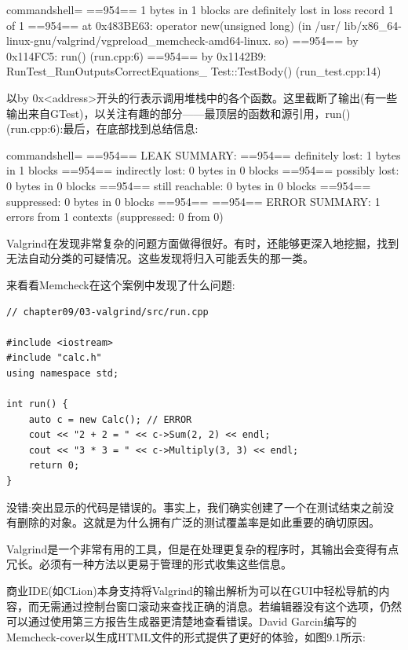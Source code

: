 \begin{tcblisting}{commandshell={}}
==954== 1 bytes in 1 blocks are definitely lost in loss record
1 of 1
==954== at 0x483BE63: operator new(unsigned long) (in /usr/
lib/x86_64-linux-gnu/valgrind/vgpreload_memcheck-amd64-linux.
so)
==954== by 0x114FC5: run() (run.cpp:6)
==954== by 0x1142B9: RunTest_RunOutputsCorrectEquations_
Test::TestBody() (run_test.cpp:14)
\end{tcblisting}

以by 0x<address>开头的行表示调用堆栈中的各个函数。这里截断了输出(有一些输出来自GTest)，以关注有趣的部分——最顶层的函数和源引用，run()(run.cpp:6):最后，在底部找到总结信息:

\begin{tcblisting}{commandshell={}}
==954== LEAK SUMMARY:
==954==     definitely lost: 1 bytes in 1 blocks
==954==     indirectly lost: 0 bytes in 0 blocks
==954==       possibly lost: 0 bytes in 0 blocks
==954==     still reachable: 0 bytes in 0 blocks
==954==          suppressed: 0 bytes in 0 blocks
==954==
==954== ERROR SUMMARY: 1 errors from 1 contexts (suppressed: 0
from 0)
\end{tcblisting}

Valgrind在发现非常复杂的问题方面做得很好。有时，还能够更深入地挖掘，找到无法自动分类的可疑情况。这些发现将归入可能丢失的那一类。

来看看Memcheck在这个案例中发现了什么问题:

\begin{lstlisting}[style=styleCXX]
// chapter09/03-valgrind/src/run.cpp

#include <iostream>
#include "calc.h"
using namespace std;

int run() {
	auto c = new Calc(); // ERROR
	cout << "2 + 2 = " << c->Sum(2, 2) << endl;
	cout << "3 * 3 = " << c->Multiply(3, 3) << endl;
	return 0;
}
\end{lstlisting}

没错:突出显示的代码是错误的。事实上，我们确实创建了一个在测试结束之前没有删除的对象。这就是为什么拥有广泛的测试覆盖率是如此重要的确切原因。

Valgrind是一个非常有用的工具，但是在处理更复杂的程序时，其输出会变得有点冗长。必须有一种方法以更易于管理的形式收集这些信息。


商业IDE(如CLion)本身支持将Valgrind的输出解析为可以在GUI中轻松导航的内容，而无需通过控制台窗口滚动来查找正确的消息。若编辑器没有这个选项，仍然可以通过使用第三方报告生成器更清楚地查看错误。David Garcin编写的Memcheck-cover以生成HTML文件的形式提供了更好的体验，如图9.1所示:

